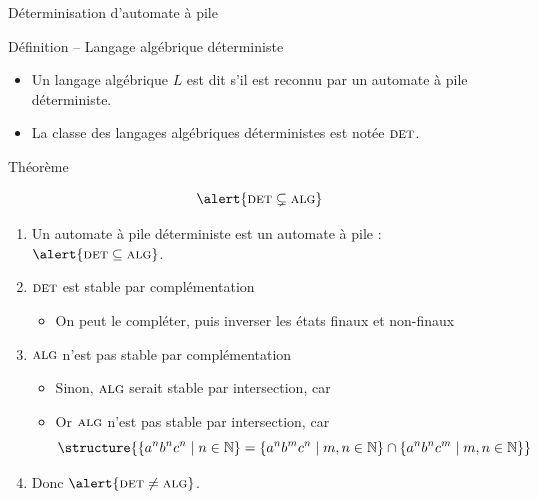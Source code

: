 
\begingroup

\begin{frame}{Déterminisation d'automate à pile}

  \begin{block}{Définition -- Langage algébrique déterministe}
    \begin{itemize}
    \item Un langage algébrique $L$ est dit  s'il est \alert{reconnu par un automate à pile déterministe}.\\
    \item La classe des langages algébriques déterministes est notée \alert{$\textsc{det}$}.
    \end{itemize}
  \end{block}
  
  \begin{block}{Théorème}
    
    \vspace{-4mm}
    $$\alert{\textsc{det} \subsetneq \textsc{alg}}$$

    \vspace{-1mm}
    \begin{enumerate}
    \item Un automate à pile déterministe est un automate à pile : $\alert{\textsc{det} \subseteq \textsc{alg}}$.
    \item $\textsc{det}$ est stable par complémentation
      \begin{itemize}
      \item On peut le compléter, puis inverser les états finaux et non-finaux
      \end{itemize}
    \item $\textsc{alg}$ n'est pas stable par complémentation
      \begin{itemize}
      \item Sinon, $\textsc{alg}$ serait stable par intersection, car 
      \item Or $\textsc{alg}$ n'est pas stable par intersection, car $$\structure{\{a^n b^n c^n \mid n\in \mathbb{N}\} = \{a^n b^m c^n \mid m, n\in \mathbb{N}\} \cap \{a^n b^n c^m \mid m, n\in \mathbb{N}\}}$$
      \end{itemize}
    \item Donc $\alert{\textsc{det} \neq \textsc{alg}}$.
    \end{enumerate}
  \end{block}

\end{frame}

\endgroup
\endinput
